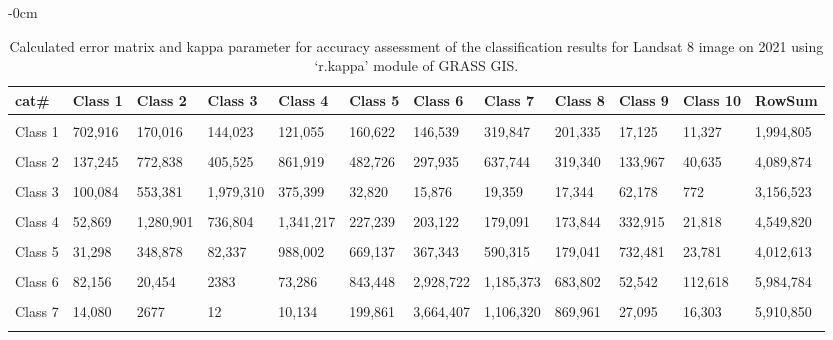 \documentclass[analytics,article,accept,pdftex,moreauthors]{Definitions/mdpi}
\begin{document}
\begin{table}[H] 
    \caption{Calculated error matrix and kappa parameter for accuracy assessment of the classification results for Landsat 8 image on 2021 using `r.kappa' module of GRASS GIS.}%
    \begin{adjustwidth}{-\extralength}{0cm}
 	\begin{tabularx}{\fulllength}{lllllllllllL}
    \toprule
                \textbf{cat\#} & \textbf{Class 1} & \textbf{Class 2} & \textbf{Class 3} & \textbf{Class 4} & \textbf{Class 5} & \textbf{Class 6} & \textbf{Class 7} & \textbf{Class 8} & \textbf{Class 9} & \textbf{Class 10} & \textbf{RowSum} \\ \hline
      &&&&&&&&&&&\\[-2ex]
        Class 1 & 702,916 & 170,016 & 144,023 & 121,055 & 160,622 & 146,539 & 319,847 & 201,335 & 17,125 & 11,327 & 1,994,805 \\ \hline
      &&&&&&&&&&&\\[-2ex]
        Class 2 & 137,245 & 772,838 & 405,525 & 861,919 & 482,726 & 297,935 & 637,744 & 319,340 & 133,967 & 40,635 & 4,089,874 \\ \hline
      &&&&&&&&&&&\\[-2ex]
        Class 3 & 100,084 & 553,381 & 1,979,310 & 375,399 & 32,820 & 15,876 & 19,359 & 17,344 & 62,178 & 772 & 3,156,523 \\ \hline
      &&&&&&&&&&&\\[-2ex]
        Class 4 & 52,869 & 1,280,901 & 736,804 & 1,341,217 & 227,239 & 203,122 & 179,091 & 173,844 & 332,915 & 21,818 & 4,549,820 \\ \hline
      &&&&&&&&&&&\\[-2ex]
        Class 5 & 31,298 & 348,878 & 82,337 & 988,002 & 669,137 & 367,343 & 590,315 & 179,041 & 732,481 & 23,781 & 4,012,613 \\ \hline
      &&&&&&&&&&&\\[-2ex]
        Class 6 & 82,156 & 20,454 & 2383 & 73,286 & 843,448 & 2,928,722 & 1,185,373 & 683,802 & 52,542 & 112,618 & 5,984,784 \\ \hline
      &&&&&&&&&&&\\[-2ex]
        Class 7 & 14,080 & 2677 & 12 & 10,134 & 199,861 & 3,664,407 & 1,106,320 & 869,961 & 27,095 & 16,303 & 5,910,850 \\ \hline
      &&&&&&&&&&&\\[-2ex]

\end{tabularx}
\end{adjustwidth}
\end{table}
\end{document}
